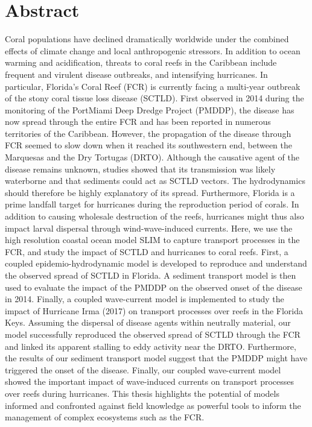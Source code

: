 
\chapter*{Abstract}

Coral populations have declined dramatically worldwide under the combined effects of climate change and local anthropogenic stressors. In addition to ocean warming and acidification, threats to coral reefs in the Caribbean include frequent and virulent disease outbreaks, and intensifying hurricanes. In particular, Florida's Coral Reef (FCR) is currently facing a multi-year outbreak of the stony coral tissue loss disease (SCTLD). First observed in 2014 during the monitoring of the PortMiami Deep Dredge Project (PMDDP), the disease has now spread through the entire FCR and has been reported in numerous territories of the Caribbean. However, the propagation of the disease through FCR seemed to slow down when it reached its southwestern end, between the Marquesas and the Dry Tortugas (DRTO). Although the causative agent of the disease remains unknown, studies showed that its transmission was likely waterborne and that sediments could act as SCTLD vectors. The hydrodynamics should therefore be highly explanatory of its spread. Furthermore, Florida is a prime landfall target for hurricanes during the reproduction period of corals. In addition to causing wholesale destruction of the reefs, hurricanes might thus also impact larval dispersal through wind-wave-induced currents. Here, we use the high resolution coastal ocean model SLIM to capture transport processes in the FCR, and study the impact of SCTLD and hurricanes to coral reefs. First, a coupled epidemio-hydrodynamic model is developed to reproduce and understand the observed spread of SCTLD in Florida. A sediment transport model is then used to evaluate the impact of the PMDDP on the observed onset of the disease in 2014. Finally, a coupled wave-current model is implemented to study the impact of Hurricane Irma (2017) on transport processes over reefs in the Florida Keys. Assuming the dispersal of disease agents within neutrally material, our model successfully reproduced the observed spread of SCTLD through the FCR and linked its apparent stalling to eddy activity near the DRTO. Furthermore, the results of our sediment transport model suggest that the PMDDP might have triggered the onset of the disease. Finally, our coupled wave-current model showed the important impact of wave-induced currents on transport processes over reefs during hurricanes. This thesis highlights the potential of models informed and confronted against field knowledge as powerful tools to inform the management of complex ecosystems such as the FCR.

